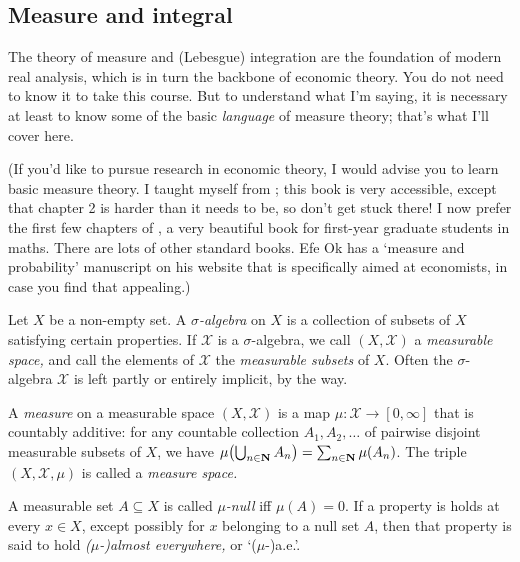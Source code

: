 \documentclass[11pt,letterpaper,reqno,oneside]{book}
\begin{document}
\begin{appendices}





\chapter{Measure and integral}
\label{ch:meas}

The theory of measure and (Lebesgue) integration are the foundation of modern real analysis, which is in turn the backbone of economic theory.
You do not need to know it to take this course.
But to understand what I'm saying,
it is necessary at least to know some of the basic \emph{language} of measure theory; that's what I'll cover here.

(If you'd like to pursue research in economic theory, I would advise you to learn basic measure theory.
I taught myself from \textcite{Rosenthal2006}; this book is very accessible, except that chapter 2 is harder than it needs to be, so don't get stuck there! I now prefer the first few chapters of \textcite{Folland1999}, a very beautiful book for first-year graduate students in maths. There are lots of other standard books. Efe Ok has a `measure and probability' manuscript on his website that is specifically aimed at economists, in case you find that appealing.)


Let $X$ be a non-empty set.
A \emph{$\sigma$-algebra} on $X$ is a collection of subsets of $X$ satisfying certain properties.
If $\mathcal{X}$ is a $\sigma$-algebra, we call $(X,\mathcal{X})$ a \emph{measurable space,} and call the elements of $\mathcal{X}$ the \emph{measurable subsets} of $X$.
Often the $\sigma$-algebra $\mathcal{X}$ is left partly or entirely implicit, by the way.

A \emph{measure} on a measurable space $(X,\mathcal{X})$ is a map $\mu : \mathcal{X} \to [0,\infty]$ that is countably additive:
for any countable collection $A_1,A_2,\dots$ of pairwise disjoint measurable subsets of $X$,
we have $\mu\left( \Union_{n \in \N} A_n \right) = \sum_{n \in \N} \mu(A_n)$.
The triple $(X,\mathcal{X},\mu)$ is called a \emph{measure space.}

A measurable set $A \subseteq X$ is called \emph{$\mu$-null} iff $\mu(A)=0$. If a property is holds at every $x \in X$, except possibly for $x$ belonging to a null set $A$, then that property is said to hold \emph{($\mu$-)almost everywhere,} or `($\mu$-)a.e.'.


\end{appendices}
\end{document}
